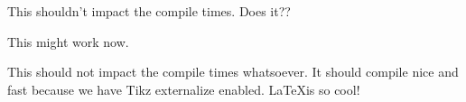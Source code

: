 %
%
%
%
%
%
%
%
%
%
%

This shouldn't impact the compile times. Does it??

This might work now.

This should not impact the compile times whatsoever. It should compile nice and
fast because we have Tikz externalize enabled. \LaTeX is so cool!
